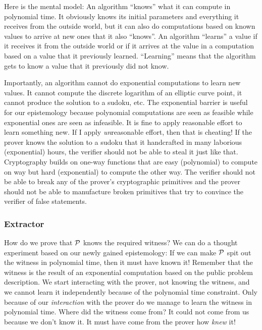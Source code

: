 Here is the mental model:
%
An algorithm \enquote{knows} what it can compute in polynomial time.
It obviously knows its initial parameters and everything it receives from the outside world,
but it can also do computations based on known values to arrive at new ones that it also \enquote{knows}.
%
An algorithm \enquote{learns} a value if it receives it from the outside world
or if it arrives at the value in a computation based on a value that it previously learned.
\enquote{Learning} means that the algorithm gets to know a value that it previously did not know.

Importantly,
an algorithm cannot do exponential computations to learn new values.
It cannot compute the discrete logarithm of an elliptic curve point,
it cannot produce the solution to a sudoku, etc.
The exponential barrier is useful for our epistemology because
polynomial computations are seen as feasible while exponential ones are seen as infeasible.
It is fine to apply reasonable effort to learn something new.
If I apply \emph{un}reasonable effort, then that is cheating!
If the prover knows the solution to a sudoku that it handcrafted in many laborious (exponential) hours,
the verifier should not be able to steal it just like that.
Cryptography builds on one-way functions that are easy (polynomial) to compute on way
but hard (exponential) to compute the other way.
The verifier should not be able to break any of the prover's cryptographic primitives
and the prover should not be able to manufacture broken primitives that try to convince the verifier of false statements.

\subsubsection{Extractor}

How do we prove that $\mathcal{P}$ knows the required witness?
%
We can do a thought experiment based on our newly gained epistemology:
If we can make $\mathcal{P}$ spit out the witness in polynomial time,
then it must have known it!
%
Remember that the witness is the result of an exponential computation based on the public problem description.
%
We start interacting with the prover,
not knowing the witness,
and we cannot learn it independently because of the polynomial time constraint.
Only because of our \emph{interaction} with the prover do we manage to learn the witness in polynomial time.
Where did the witness come from?
It could not come from us because we don't know it.
It must have come from the prover how \emph{knew} it!

